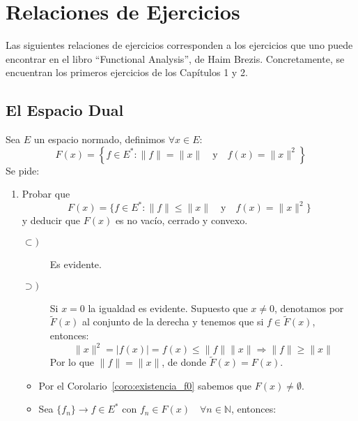 \chapter{Relaciones de Ejercicios}
\noindent
Las siguientes relaciones de ejercicios corresponden a los ejercicios que uno puede encontrar en el libro ``Functional Analysis'', de Haim Brezis. Concretamente, se encuentran los primeros ejercicios de los Capítulos 1 y 2.
\section{El Espacio Dual}

\begin{ejercicio}
    Sea $E$ un espacio normado, definimos $\forall x\in E$:
    \begin{equation*}
        F(x) = \left\{f\in E^\ast : \|f\| = \|x\| \quad \text{y}\quad f(x)=\|x\|^2\right\}
    \end{equation*}
    Se pide:
    \begin{enumerate}[label=\alph*)]
        \item Probar que
            \begin{equation*}
                F(x) = \{f\in E^\ast : \|f\|\leq \|x\| \quad \text{y}\quad f(x)=\|x\|^2\}
            \end{equation*}
            y deducir que $F(x)$ es no vacío, cerrado y convexo.
            \begin{description}
                \item [$\subset)$] Es evidente.
                \item [$\supset)$] Si $x=0$ la igualdad es evidente. Supuesto que $x\neq 0$, denotamos por $\tilde{F}(x)$ al conjunto de la derecha y tenemos que si $f\in \tilde{F}(x)$, entonces:
                    \begin{equation*}
                        \|x\|^2 = |f(x)| = f(x) \leq \|f\|\|x\| \Longrightarrow \|f\|\geq \|x\|
                    \end{equation*}
                    Por lo que $\|f\| = \|x\|$, de donde $\tilde{F}(x) = F(x)$.
            \end{description}
            \begin{itemize}
                \item Por el Corolario~\ref{coro:existencia_f0} sabemos que $F(x)\neq \emptyset $.
                \item Sea $\{f_n\}\to f\in E^\ast$ con $f_n\in F(x) \quad \forall n\in \mathbb{N}$, entonces:
                    \begin{align*}

\end{align*}
\end{itemize}
\end{enumerate}
\end{ejercicio}
